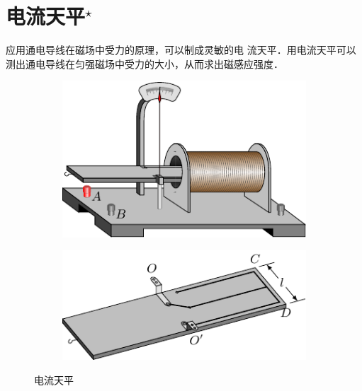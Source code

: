 \section{电流天平$^\star$}
应用通电导线在磁场中受力的原理，可以制成灵敏的电
流天平．用电流天平可以测出通电导线在匀强磁场中受力的大小，从而求出磁感应强度．
\begin{figure}[htbp]
    \centering
    \begin{subfigure}{0.4\linewidth}
        \centering
        \includegraphics{fig/C/1-28a.pdf}
        \caption{}\label{fig_C_1-28a}
    \end{subfigure}
    \hfil
    \begin{subfigure}{0.4\linewidth}
        \centering
        \includegraphics{fig/C/1-28b.pdf}
        \caption{}\label{fig_C_1-28b}
    \end{subfigure}
    \caption{电流天平}\label{fig_C_1-28}
\end{figure}


